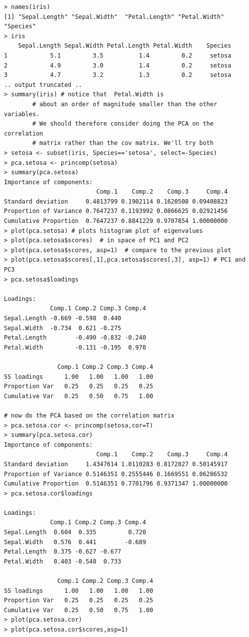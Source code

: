 \begin{lstlisting}
> names(iris)
[1] "Sepal.Length" "Sepal.Width"  "Petal.Length" "Petal.Width"  "Species"     
> iris
    Sepal.Length Sepal.Width Petal.Length Petal.Width    Species
1            5.1         3.5          1.4         0.2     setosa
2            4.9         3.0          1.4         0.2     setosa
3            4.7         3.2          1.3         0.2     setosa    
.. output truncated ..
> summary(iris) # notice that  Petal.Width is
        # about an order of magnitude smaller than the other variables.
        # We should therefore consider doing the PCA on the correlation
        # matrix rather than the cov matrix. We'll try both
> setosa <- subset(iris, Species=='setosa', select=-Species)        
> pca.setosa <- princomp(setosa)
> summary(pca.setosa)
Importance of components:
                          Comp.1    Comp.2    Comp.3     Comp.4
Standard deviation     0.4813799 0.1902114 0.1620508 0.09408823
Proportion of Variance 0.7647237 0.1193992 0.0866625 0.02921456
Cumulative Proportion  0.7647237 0.8841229 0.9707854 1.00000000
> plot(pca.setosa) # plots histogram plot of eigenvalues
> plot(pca.setosa$scores)  # in space of PC1 and PC2
> plot(pca.setosa$scores, asp=1)  # compare to the previous plot     
> plot(pca.setosa$scores[,1],pca.setosa$scores[,3], asp=1) # PC1 and PC3
> pca.setosa$loadings

Loadings:
             Comp.1 Comp.2 Comp.3 Comp.4
Sepal.Length -0.669 -0.598  0.440       
Sepal.Width  -0.734  0.621 -0.275       
Petal.Length        -0.490 -0.832 -0.240
Petal.Width         -0.131 -0.195  0.970

               Comp.1 Comp.2 Comp.3 Comp.4
SS loadings      1.00   1.00   1.00   1.00
Proportion Var   0.25   0.25   0.25   0.25
Cumulative Var   0.25   0.50   0.75   1.00

# now do the PCA based on the correlation matrix
> pca.setosa.cor <- princomp(setosa,cor=T)
> summary(pca.setosa.cor)
Importance of components:
                          Comp.1    Comp.2    Comp.3     Comp.4
Standard deviation     1.4347614 1.0110283 0.8172027 0.50145917
Proportion of Variance 0.5146351 0.2555446 0.1669551 0.06286532
Cumulative Proportion  0.5146351 0.7701796 0.9371347 1.00000000
> pca.setosa.cor$loadings

Loadings:
             Comp.1 Comp.2 Comp.3 Comp.4
Sepal.Length  0.604  0.335         0.720
Sepal.Width   0.576  0.441        -0.689
Petal.Length  0.375 -0.627 -0.677       
Petal.Width   0.403 -0.548  0.733       

               Comp.1 Comp.2 Comp.3 Comp.4
SS loadings      1.00   1.00   1.00   1.00
Proportion Var   0.25   0.25   0.25   0.25
Cumulative Var   0.25   0.50   0.75   1.00
> plot(pca.setosa.cor)
> plot(pca.setosa.cor$scores,asp=1)
\end{lstlisting}
